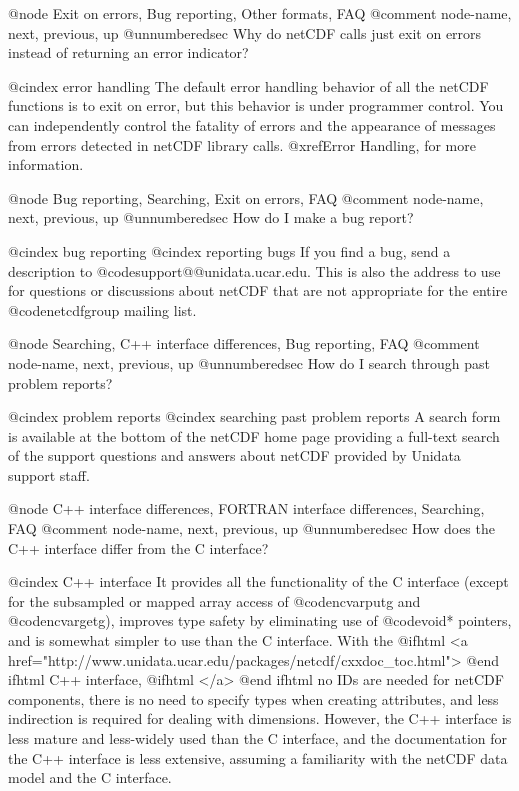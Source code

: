 {@node Exit on errors, Bug reporting, Other formats, FAQ
@comment  node-name,  next,  previous,  up
@unnumberedsec Why do netCDF calls just exit on errors instead of returning an error indicator?

@cindex error handling
The default error handling behavior of all the netCDF
functions is to exit on error, but this behavior is under programmer
control.  You can independently control the fatality of errors and the
appearance of
messages from errors detected in netCDF library calls.
@xref{Error Handling},
for more information.


@node Bug reporting, Searching, Exit on errors, FAQ
@comment  node-name,  next,  previous,  up
@unnumberedsec How do I make a bug report?

@cindex bug reporting
@cindex reporting bugs
If you find a bug, send a description to @code{support@@unidata.ucar.edu}.
This is also the address to use for questions or discussions about
netCDF that are not appropriate for the entire @code{netcdfgroup}
mailing list.



@node Searching, C++ interface differences, Bug reporting, FAQ
@comment  node-name,  next,  previous,  up
@unnumberedsec How do I search through past problem reports?

@cindex problem reports
@cindex searching past problem reports
A search form is available at the bottom of the
netCDF home page
providing a
full-text search of the support questions and answers about netCDF
provided by Unidata support staff.

@node C++ interface differences, FORTRAN interface differences, Searching, FAQ
@comment  node-name,  next,  previous,  up
@unnumberedsec How does the C++ interface differ from the C interface?

@cindex C++ interface
It provides all the functionality of the C interface (except for the
subsampled or mapped array access of @code{ncvarputg} and
@code{ncvargetg}), improves type safety by eliminating use of @code{void*}
pointers, and is somewhat simpler to use than the C interface.  With the
@ifhtml
<a href="http://www.unidata.ucar.edu/packages/netcdf/cxxdoc_toc.html">
@end ifhtml
C++ interface, 
@ifhtml
</a>
@end ifhtml
no IDs are needed for netCDF components, there is no need
to specify types when creating attributes, and less indirection is
required for dealing with dimensions.  However, the C++ interface is
less mature and less-widely used than the C interface, and the
documentation for the C++ interface is less extensive, assuming a
familiarity with the netCDF data model and the C interface.


}
